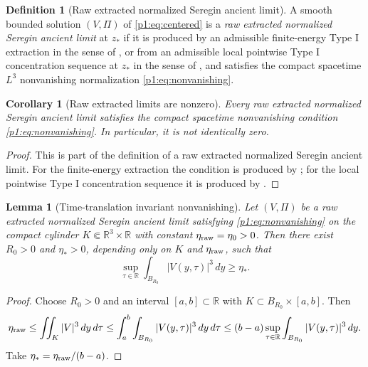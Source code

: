 \documentclass[11pt]{amsart}
\theoremstyle{plain}
\newtheorem{lemma}[lemma]{Lemma}
\newtheorem{corollary}[corollary]{Corollary}
\theoremstyle{definition}
\newtheorem{definition}[definition]{Definition}
\theoremstyle{remark}
\numberwithin{equation}{section}
\newcommand{\R}{\mathbb R}
\begin{document}
\begin{definition}[Raw extracted normalized Seregin ancient limit]
\label{p1:def:seregin-limit}
A smooth bounded solution \((V,\Pi)\) of \eqref{p1:eq:centered} is a
\emph{raw extracted normalized Seregin ancient limit} at \(z_*\) if it is
produced by an admissible finite-energy Type I extraction in the sense of
, or from an admissible local
pointwise Type I concentration sequence at \(z_*\) in the sense of
,
and satisfies the compact spacetime \(L^3\) nonvanishing normalization
\eqref{p1:eq:nonvanishing}.
\end{definition}

\begin{corollary}[Raw extracted limits are nonzero]
\label{p1:cor:raw-extracted-nonzero}
Every raw extracted normalized Seregin ancient limit satisfies the compact
spacetime nonvanishing condition \eqref{p1:eq:nonvanishing}.  In particular,
it is not identically zero.
\end{corollary}

\begin{proof}
This is part of the definition of a raw extracted normalized Seregin ancient
limit.  For the finite-energy extraction the condition is produced by
; for the
local pointwise Type I concentration sequence it is produced by
.
\end{proof}

\begin{lemma}[Time-translation invariant nonvanishing]
\label{p1:lem:compact-to-invariant-nonzero}
Let \((V,\Pi)\) be a raw extracted normalized Seregin ancient limit
satisfying \eqref{p1:eq:nonvanishing} on the compact cylinder
\(K\Subset\R^3\times\R\) with constant \(\eta_{\rm raw}=\eta_0>0\).  Then
there exist \(R_0>0\) and \(\eta_*>0\), depending only on \(K\) and
\(\eta_{\rm raw}\), such that
\begin{equation}\label{p1:eq:invariant-nonvanishing}
   \sup_{\tau\in\R}
   \int_{B_{R_0}}|V(y,\tau)|^3\,dy
   \ge \eta_* .
\end{equation}
\end{lemma}

\begin{proof}
Choose \(R_0>0\) and an interval \([a,b]\subset\R\) with
\(K\subset B_{R_0}\times[a,b]\).  Then
\[
   \eta_{\rm raw}
   \le
   \iint_K |V|^3\,dy\,d\tau
   \le
   \int_a^b\int_{B_{R_0}}|V(y,\tau)|^3\,dy\,d\tau
   \le (b-a)\sup_{\tau\in\R}\int_{B_{R_0}}|V(y,\tau)|^3\,dy .
\]
Take \(\eta_*=\eta_{\rm raw}/(b-a)\).
\end{proof}
\end{document}
